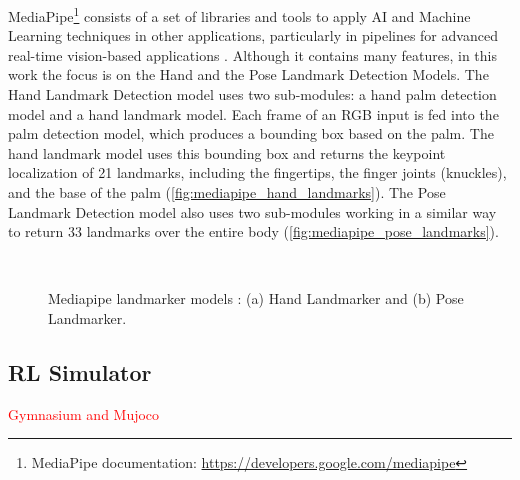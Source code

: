 MediaPipe\footnote{MediaPipe documentation: \url{https://developers.google.com/mediapipe}} consists of a set of libraries and tools to apply AI and Machine Learning techniques in other applications, particularly in pipelines for advanced real-time vision-based applications \cite{Lugaresi2019}. Although it contains many features, in this work the focus is on the Hand and the Pose Landmark Detection Models.
The Hand Landmark Detection model \cite{Zhang2020} uses two sub-modules: a hand palm detection model and a hand landmark model. Each frame of an RGB input is fed into the palm detection model, which produces a bounding box based on the palm. The hand landmark model uses this bounding box and returns the keypoint localization of 21 landmarks, including the fingertips, the finger joints (knuckles), and the base of the palm (\autoref{fig:mediapipe_hand_landmarks}). The Pose Landmark Detection model also uses two sub-modules working in a similar way to return 33 landmarks over the entire body (\autoref{fig:mediapipe_pose_landmarks}).

\begin{figure}[ht]
    \centering
    \begin{subfigure}[b]{0.49\textwidth}
        \caption{}
        \label{fig:mediapipe_hand_landmarks}
    \end{subfigure} \
    \begin{subfigure}[b]{0.49\textwidth}
        \caption{}
        \label{fig:mediapipe_pose_landmarks}
    \end{subfigure}
    \caption[Mediapipe landmarker models: Hand Landmarker and Pose Landmarker.]{Mediapipe landmarker models \cite{mediapipe_docs}: (a) Hand Landmarker and (b) Pose Landmarker.}
    \label{fig:mediapipe_landmarks}
\end{figure}

\subsection{RL Simulator}

\textcolor{red}{Gymnasium and Mujoco}